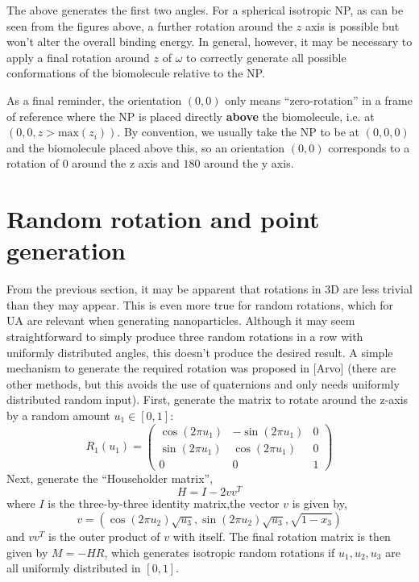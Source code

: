 \documentclass[10pt,a4paper,onecolumn]{report}
\begin{document}
The above generates the first two angles. For a spherical isotropic NP, as can be seen from the figures above, a further rotation around the $z$ axis is possible but won't alter the overall binding energy. In general, however, it may be necessary to apply a final rotation around $z$ of $\omega$ to correctly generate all possible conformations of the biomolecule relative to the NP.

As a final reminder, the orientation $(0,0)$ only means ``zero-rotation'' in a frame of reference where the NP is placed directly \textbf{above} the biomolecule, i.e. at $(0,0,z > \mathrm{max}(z_i) )$. By convention, we usually take the NP to be at $(0,0,0)$ and the biomolecule placed above this, so an orientation $(0,0)$ corresponds to a rotation of $0$ around the z axis and $180$ around the y axis. 

\section{Random rotation and point generation}
 From the previous section, it may be apparent that rotations in 3D are less trivial than they may appear. This is even more true for random rotations, which for UA are relevant when generating nanoparticles. Although it may seem straightforward to simply produce three random rotations in a row with uniformly distributed angles, this doesn't produce the desired result. A simple mechanism to generate the required rotation was proposed in [Arvo] (there are other methods, but this avoids the use of quaternions and only needs uniformly distributed random input). First, generate the matrix to rotate around the z-axis by a random amount $u_1 \in [0,1]$:
 \begin{equation}
R_1(u_1) =  \begin{pmatrix}  \cos (2 \pi u_1) & -\sin (2 \pi u_1) & 0 \\
 \sin (2 \pi u_1) & \cos (2 \pi u_1) & 0 \\
 0 & 0 & 1  \end{pmatrix}
\end{equation}
Next, generate the ``Householder matrix'', 
\begin{equation}
H = I - 2 v v^T
\end{equation}
where $I$ is the three-by-three identity matrix,the vector $v$ is given by,
\begin{equation}
v = ( \cos(2 \pi u_2) \sqrt{u_3} ,  \sin(2 \pi u_2) \sqrt{u_3}, \sqrt{1-x_3}  )
\end{equation}
and $v v^T$ is the outer product of $v$ with itself. The final rotation matrix is then given by $M = -H R$, which generates isotropic random rotations if $u_1, u_2, u_3$ are all uniformly distributed in $[0,1]$. 
 
\end{document}
